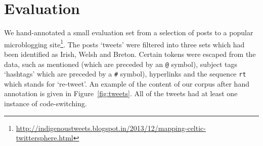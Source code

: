 \documentclass[11pt]{article}
\begin{document}


%
%


\section{Evaluation}
\label{sec:eval}

We hand-annotated a small evaluation set from a selection of posts to a popular microblogging site\footnote{\url{http://indigenoustweets.blogspot.in/2013/12/mapping-celtic-twittersphere.html}}. The posts `tweets' were filtered into three sets which had been identified as Irish, Welsh and Breton.  Certain tokens were escaped from the data, such as mentioned (which are preceded by an \texttt{@} symbol), subject tags `hashtags' which are preceded by a \texttt{\#} symbol), hyperlinks and the sequence \texttt{rt} which stands for `re-tweet'. An example of the content of our corpus after hand annotation is given in Figure~\ref{fig:tweets}. All of the tweets had at least one instance of code-switching.
\end{document}
